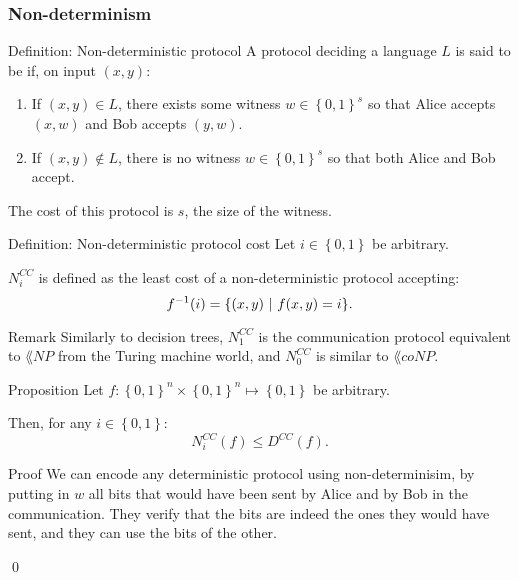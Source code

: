 \documentclass[a4paper]{article}
\begin{document}
\subsubsection{Non-determinism}

\begin{parag}{Definition: Non-deterministic protocol}
    A protocol deciding a language $L$ is said to be  if, on input $\left(x, y\right)$:
    \begin{enumerate}
        \item If $\left(x,y\right) \in L$, there exists some witness $w \in \left\{0, 1\right\}^s$ so that Alice accepts $\left(x, w\right)$ and Bob accepts $\left(y, w\right)$.
        \item If $\left(x, y\right) \not \in L$, there is no witness $w \in \left\{0, 1\right\}^s$ so that both Alice and Bob accept.
    \end{enumerate}

    The cost of this protocol is $s$, the size of the witness. 
\end{parag}

\begin{parag}{Definition: Non-deterministic protocol cost}
    Let $i \in \left\{0, 1\right\}$ be arbitrary.

    $N_i^{CC}$ is defined as the least cost of a non-deterministic protocol accepting:
    \[f^{-1}\left(i\right) = \left\{\left(x, y\right) \suchthat f\left(x, y\right) = i\right\}.\]

    \begin{subparag}{Remark}
        Similarly to decision trees, $N_1^{CC}$ is the communication protocol equivalent to $\lang{NP}$ from the Turing machine world, and $N_0^{CC}$ is similar to $\lang{coNP}$.
    \end{subparag}
\end{parag}

\begin{parag}{Proposition}
    Let $f: \left\{0, 1\right\}^n \times \left\{0, 1\right\}^n \mapsto \left\{0, 1\right\}$ be arbitrary.

    Then, for any $i \in \left\{0, 1\right\}$: 
    \[N_i^{CC}\left(f\right) \leq D^{CC}\left(f\right).\]

    \begin{subparag}{Proof}
        We can encode any deterministic protocol using non-determinisim, by putting in $w$ all bits that would have been sent by Alice and by Bob in the communication. They verify that the bits are indeed the ones they would have sent, and they can use the bits of the other.

        \qed
    \end{subparag}
\end{parag}
\end{document}
